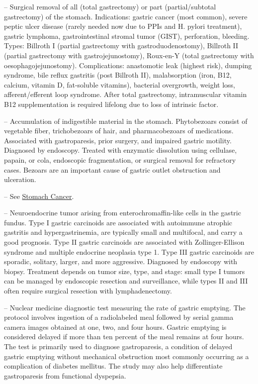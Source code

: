 -- Surgical removal of all (total gastrectomy) or part (partial/subtotal gastrectomy) of the stomach. Indications: gastric cancer (most common), severe peptic ulcer disease (rarely needed now due to PPIs and H. pylori treatment), gastric lymphoma, gastrointestinal stromal tumor (GIST), perforation, bleeding. Types: Billroth I (partial gastrectomy with gastroduodenostomy), Billroth II (partial gastrectomy with gastrojejunostomy), Roux-en-Y (total gastrectomy with oesophagojejunostomy). Complications: anastomotic leak (highest risk), dumping syndrome, bile reflux gastritis (post Billroth II), malabsorption (iron, B12, calcium, vitamin D, fat-soluble vitamins), bacterial overgrowth, weight loss, afferent/efferent loop syndrome. After total gastrectomy, intramuscular vitamin B12 supplementation is required lifelong due to loss of intrinsic factor.

-- Accumulation of indigestible material in the stomach. Phytobezoars consist of vegetable fiber, trichobezoars of hair, and pharmacobezoars of medications. Associated with gastroparesis, prior surgery, and impaired gastric motility. Diagnosed by endoscopy. Treated with enzymatic dissolution using cellulase, papain, or cola, endoscopic fragmentation, or surgical removal for refractory cases. Bezoars are an important cause of gastric outlet obstruction and ulceration.

-- See \hyperlink{Stomach Cancer}{Stomach Cancer}.

-- Neuroendocrine tumor arising from enterochromaffin-like cells in the gastric fundus. Type I gastric carcinoids are associated with autoimmune atrophic gastritis and hypergastrinemia, are typically small and multifocal, and carry a good prognosis. Type II gastric carcinoids are associated with Zollinger-Ellison syndrome and multiple endocrine neoplasia type 1. Type III gastric carcinoids are sporadic, solitary, larger, and more aggressive. Diagnosed by endoscopy with biopsy. Treatment depends on tumor size, type, and stage: small type I tumors can be managed by endoscopic resection and surveillance, while types II and III often require surgical resection with lymphadenectomy.

-- Nuclear medicine diagnostic test measuring the rate of gastric emptying. The protocol involves ingestion of a radiolabeled meal followed by serial gamma camera images obtained at one, two, and four hours. Gastric emptying is considered delayed if more than ten percent of the meal remains at four hours. The test is primarily used to diagnose gastroparesis, a condition of delayed gastric emptying without mechanical obstruction most commonly occurring as a complication of diabetes mellitus. The study may also help differentiate gastroparesis from functional dyspepsia.

